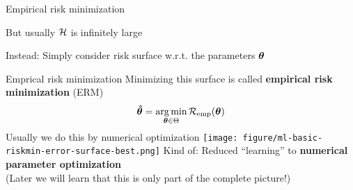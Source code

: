 \documentclass[11pt,compress,t,notes=noshow, xcolor=table]{beamer}
\begin{document}
\begin{framei}{Empirical risk minimization}
\item But usually $\mathcal{H}$ is infinitely large
\item Instead: Simply consider risk surface w.r.t. the parameters $\bm{\theta}$ 
{
}
\end{framei}


\begin{frame2}{Emprical risk minimization}
Minimizing this surface is called \textbf{empirical risk minimization} (ERM)
$$
\bm{\hat\theta} = \mathop{\mathrm{arg\,min}}_{\bm{\theta} \in \Theta} \mathcal{R}_{\text{emp}}(\bm{\theta})
$$
Usually we do this by numerical optimization
{
\vfill
\texttt{[image: figure/ml-basic-riskmin-error-surface-best.png]}
}
\vfill
Kind of: Reduced ``learning'' to \textbf{numerical parameter optimization}\\
(Later we will learn that this is only part of the complete picture!)
\end{frame2}

\endlecture
\end{document}
